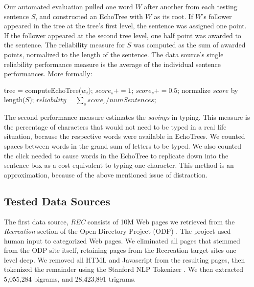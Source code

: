 \documentclass{sigchi}
\begin{document}
Our automated evaluation pulled one word $W$ after another from each
testing sentence $S$, and constructed an EchoTree with $W$ as its
root. If $W$'s follower appeared in the tree at the tree's first
level, the sentence was assigned one point. If the follower appeared
at the second tree level, one half point was awarded to the
sentence. The reliability measure for $S$ was computed as the sum of
awarded points, normalized to the length of the sentence. The data
source's single reliability performance measure is the average of the
individual sentence performances. More formally:

\begin{algorithmic}
        \STATE tree = computeEchoTree($w_i$);
            \STATE $score_s += 1$;
            \STATE $score_s += 0.5$;
        \ENDIF
     \ENDFOR
     \STATE normalize $score$ by length($S$);
  \ENDFOR
  \STATE $reliability = \sum_s score_s / numSentences$;
\end{algorithmic}            

The second performance measure estimates the {\em savings} in
typing. This measure is the percentage of characters that would not
need to be typed in a real life situation, because the respective
words were available in EchoTrees. We counted spaces between words in
the grand sum of letters to be typed. We also counted the click needed to
cause words in the EchoTree to replicate down into the sentence box as
a cost equivalent to typing one character. This method is an
approximation, because of the above mentioned issue of distraction.

\subsection{Tested Data Sources}

The first data source, {\em REC} consists of 10M Web pages we
retrieved from the {\em Recreation} section of the Open Directory
Project (ODP) \cite{dmoz}. The project used human input to categorized
Web pages. We eliminated all pages that stemmed from the ODP site
itself, retaining pages from the Recreation target sites one level
deep. We removed all HTML and Javascript from the resulting pages,
then tokenized the remainder using the Stanford NLP Tokenizer
\cite{tokenizer}. We then extracted 5,055,284 bigrams, and 28,423,891
trigrams.
\end{document}
